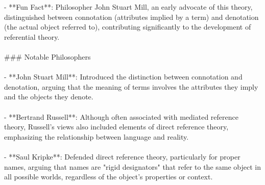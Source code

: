 \documentclass[a4paper,12pt,single,pdftex]{scrartcl}
\begin{document}
    
      - **Fun Fact**: Philosopher John Stuart Mill, an early advocate of this theory, distinguished between connotation (attributes implied by a term) and denotation (the actual object referred to), contributing significantly to the development of referential theory.
    \\

    
      
    \\

    
      \#\#\# Notable Philosophers
    \\

    
      
    \\

    
      - **John Stuart Mill**: Introduced the distinction between connotation and denotation, arguing that the meaning of terms involves the attributes they imply and the objects they denote.
    \\

    
      
    \\

    
      - **Bertrand Russell**: Although often associated with mediated reference theory, Russell's views also included elements of direct reference theory, emphasizing the relationship between language and reality.
    \\

    
      
    \\

    
      - **Saul Kripke**: Defended direct reference theory, particularly for proper names, arguing that names are "rigid designators" that refer to the same object in all possible worlds, regardless of the object's properties or context.
    \\
\end{document}

